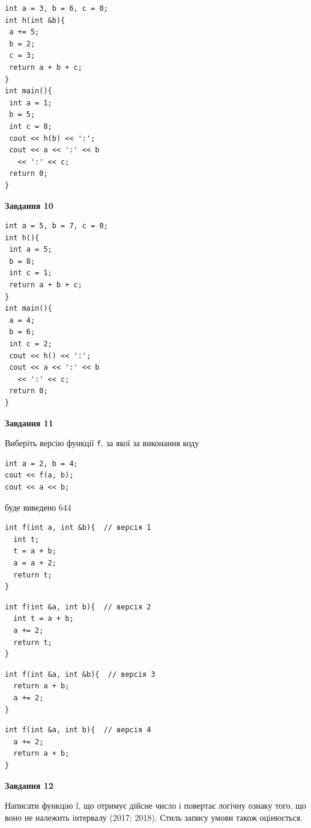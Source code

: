 \documentclass[12pt, ukrainian]{article}
\def\code#1{\Verb!#1!}
\begin{document}
{\begin {large}
\begin{minipage}[t]{7.0cm}
\begin{verbatim}
int a = 3, b = 6, c = 0;
int h(int &b){
 a += 5;
 b = 2;
 c = 3;
 return a + b + c;
}
int main(){
 int a = 1;
 b = 5;
 int c = 8;
 cout << h(b) << ':';
 cout << a << ':' << b 
   << ':' << c;
 return 0;
}
\end{verbatim}



\begin{center}
\textbf{Завдання 10}
\end{center}
\vspace{-8mm}

\begin{verbatim}
int a = 5, b = 7, c = 0;
int h(){
 int a = 5;
 b = 8;
 int c = 1;
 return a + b + c;
}
int main(){
 a = 4;
 b = 6;
 int c = 2;
 cout << h() << ':';
 cout << a << ':' << b 
   << ':' << c;
 return 0;
}
\end{verbatim}

\end{minipage}
\vline \hspace{1mm}
\begin{minipage}[t]{11.0cm}

\begin{center}
\textbf{Завдання 11}
\end{center}
Виберіть версію функції \code{f}, за якої за виконання коду
\begin{verbatim}
int a = 2, b = 4;
cout << f(a, b);
cout << a << b;
\end{verbatim}

буде виведено 644

\begin{verbatim}
int f(int a, int &b){  // версія 1
  int t;
  t = a + b;
  a = a + 2;
  return t;
}
\end{verbatim}

\vspace{-8mm}\begin{verbatim}
int f(int &a, int b){  // версія 2
  int t = a + b;
  a += 2;
  return t;
}
\end{verbatim}

\vspace{-8mm}\begin{verbatim}
int f(int &a, int &b){  // версія 3
  return a + b;
  a += 2;
}
\end{verbatim}

\vspace{-8mm}\begin{verbatim}
int f(int &a, int b){  // версія 4
  a += 2;
  return a + b;
}
\end{verbatim}



\begin{center}
\textbf{Завдання 12}
\end{center}

Написати функцiю f, що отримує дійсне число і повертає логічну ознаку того, що воно не належить iнтервалу (2017; 2018). Стиль запису умови також оцінюється.\par

\end{minipage}

\end {large}}
\end{document}
